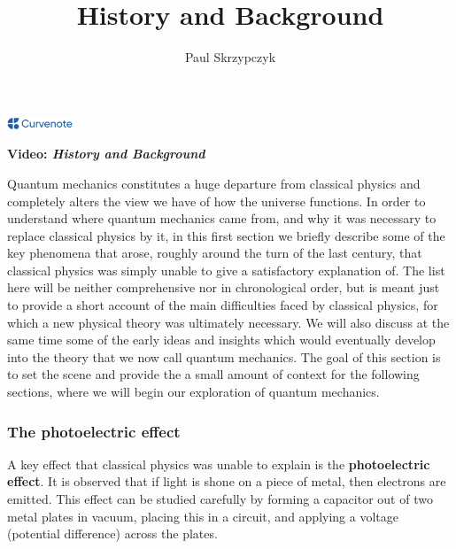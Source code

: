 \documentclass{article}
\title{History and Background}
\author{Paul Skrzypczyk}
\date{\displaydate{articleDate}}
\newcommand{\logo}{
  \href{https://curvenote.com}{\includegraphics[width=2cm]{curvenote.png}}
}
\begin{document}
\maketitle
\begin{center}\logo\end{center}


\begin{framed}
\textbf{Video: \textit{History and Background}}\\
\end{framed}

Quantum mechanics constitutes a huge departure from classical physics and completely alters the view we have of how the universe functions. In order to understand where quantum mechanics came from, and why it was necessary to replace classical physics by it, in this first section we briefly describe some of the key phenomena that arose, roughly around the turn of the last century, that classical physics was simply unable to give a satisfactory explanation of. The list here will be neither comprehensive nor in chronological order, but is meant just to provide a short account of the main difficulties faced by classical physics, for which a new physical theory was ultimately necessary. We will also discuss at the same time some of the early ideas and insights which would eventually develop into the theory that we now call quantum mechanics. The goal of this section is to set the scene and provide the a small amount of context for the following sections, where we will begin our exploration of quantum mechanics.

\subsubsection{The photoelectric effect}\label{s-photoelec}

A key effect that classical physics was unable to explain is the \textbf{photoelectric effect}. It is observed that if light is shone on a piece of metal, then electrons are emitted. This effect can be studied carefully by forming a capacitor out of two metal plates in vacuum, placing this in a circuit, and applying a voltage (potential difference) across the plates.
\end{document}
